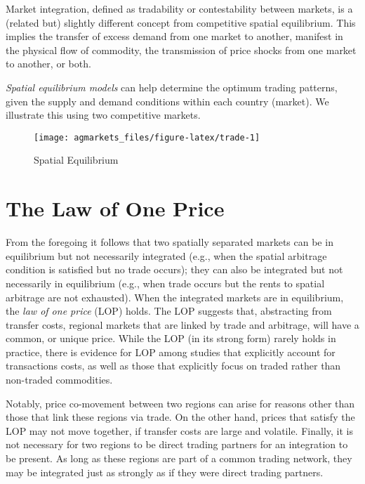 \documentclass[
  oneside]{book}
\begin{document}
Market integration, defined as tradability or contestability between markets, is a (related but) slightly different concept from competitive spatial equilibrium. This implies the transfer of excess demand from one market to another, manifest
in the physical flow of commodity, the transmission of price shocks from one market to another, or both.

\emph{Spatial equilibrium models} can help determine the optimum trading patterns, given the supply and demand conditions within each country (market). We illustrate this using two competitive markets.

\begin{figure}

{\centering \texttt{[image: agmarkets\_files/figure-latex/trade-1]} 

}

\caption{Spatial Equilibrium}\label{fig:trade}
\end{figure}

\hypertarget{the-law-of-one-price}{%
\section{The Law of One Price}\label{the-law-of-one-price}}

From the foregoing it follows that two spatially separated markets can be in equilibrium but not necessarily integrated (e.g., when the spatial arbitrage condition is satisfied but no trade occurs); they can also be integrated but not necessarily in equilibrium (e.g., when trade occurs but the rents to spatial arbitrage are not exhausted). When the integrated markets are in equilibrium, the \emph{law of one price} (LOP) holds. The LOP suggests that, abstracting from transfer costs, regional markets that are linked by trade and arbitrage, will have a common, or unique price. While the LOP (in its strong form) rarely holds in practice, there is evidence for LOP among studies that explicitly account for transactions costs, as well as those that explicitly focus on traded rather than non-traded commodities.

Notably, price co-movement between two regions can arise for reasons other than those that link these regions via trade. On the other hand, prices that satisfy the LOP may not move together, if transfer costs are large and volatile. Finally, it is not necessary for two regions to be direct trading partners for an integration to be present. As long as these regions are part of a common trading network, they may be integrated just as strongly as if they were direct trading partners.
\end{document}
